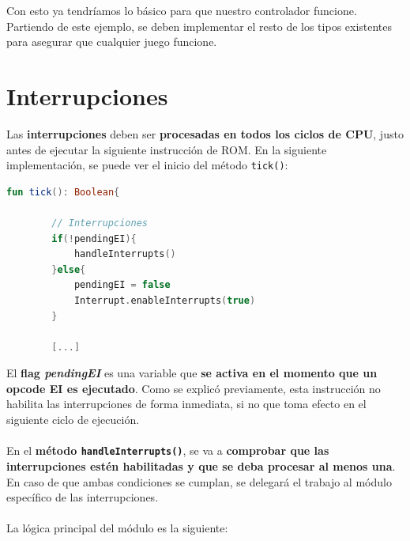 Con esto ya tendríamos lo básico para que nuestro controlador funcione. Partiendo de este ejemplo, se deben implementar el resto de los tipos existentes para asegurar que cualquier juego funcione.

\section{Interrupciones}

Las \textbf{interrupciones} deben ser \textbf{procesadas en todos los ciclos de CPU}, justo antes de ejecutar la siguiente instrucción de ROM. En la siguiente implementación, se puede ver el inicio del método \texttt{tick()}:

\begin{lstlisting}[language=Kotlin, caption={Interrupciones en el método principal de la CPU.}, label={code:cpuhandleinterrupt}]
    fun tick(): Boolean{

        // Interrupciones
        if(!pendingEI){
            handleInterrupts()
        }else{
            pendingEI = false
            Interrupt.enableInterrupts(true)
        }

        [...]
\end{lstlisting}

El \textbf{flag \textit{pendingEI}} es una variable que \textbf{se activa en el momento que un opcode EI es ejecutado}. Como se explicó previamente, esta instrucción no habilita las interrupciones de forma inmediata, si no que toma efecto en el siguiente ciclo de ejecución.
\\\\
En el \textbf{método \texttt{handleInterrupts()}}, se va a \textbf{comprobar que las interrupciones estén habilitadas y que se deba procesar al menos una}. En caso de que ambas condiciones se cumplan, se delegará el trabajo al módulo específico de las interrupciones.
\\\\
La lógica principal del módulo es la siguiente:


